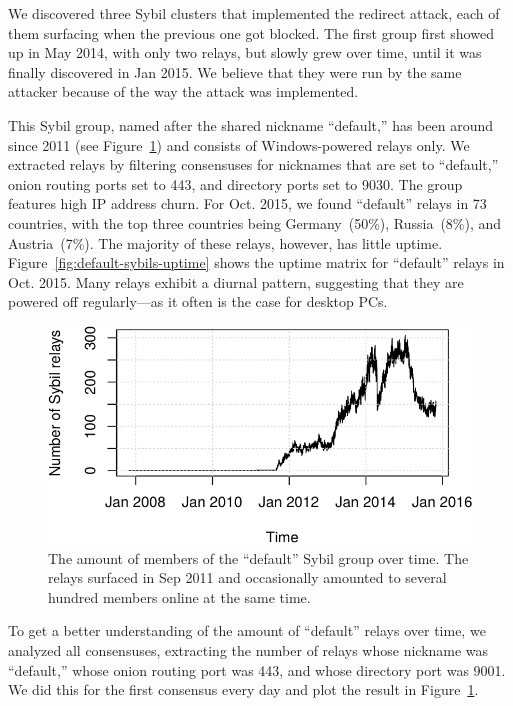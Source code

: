 We discovered three Sybil clusters that implemented the redirect attack, each of
them surfacing when the previous one got blocked.  The first group first showed
up in May 2014, with only two relays, but slowly grew over time, until it was
finally discovered in Jan 2015.  We believe that they were run by the same
attacker because of the way the attack was implemented.

This Sybil group, named after the shared nickname ``default,'' has been around
since 2011 (see Figure~\ref{fig:default-over-time}) and consists of
Windows-powered relays only.  We extracted relays by filtering consensuses
for nicknames that are set to ``default,'' onion routing ports set to 443, and
directory ports set to 9030.  The group features high IP address churn.  For
Oct. 2015, we found ``default'' relays in 73 countries, with the top three
countries being Germany~(50\%), Russia~(8\%), and Austria~(7\%).  The majority
of these relays, however, has little uptime.
Figure~\ref{fig:default-sybils-uptime} shows the uptime matrix for ``default''
relays in Oct. 2015.  Many relays exhibit a diurnal pattern, suggesting
that they are powered off regularly---as it often is the case for desktop PCs.

\begin{figure}[t]
	\centering
	\includegraphics[width=\linewidth]{diagrams/default-over-time}
	\caption{The amount of members of the ``default'' Sybil group over time.
		The relays surfaced in Sep 2011 and occasionally amounted to several
		hundred members online at the same time.}
	\label{fig:default-over-time}
\end{figure}

To get a better understanding of the amount of ``default'' relays over time, we
analyzed all consensuses, extracting the number of relays whose nickname was
``default,'' whose onion routing port was 443, and whose directory port was
9001.  We did this for the first consensus every day and plot the result in
Figure~\ref{fig:default-over-time}.

